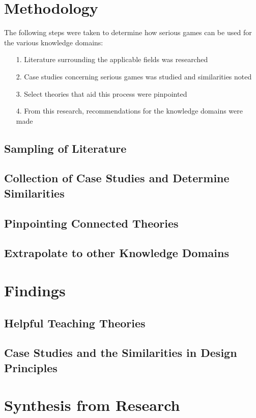 \documentclass[conference]{IEEEtran}
\begin{document}
\section{Methodology}
The following steps were taken to determine how serious games can be used for the various knowledge domains:

\begin{itemize}
\item[1.] Literature surrounding the applicable fields was researched
\item[2.] Case studies concerning serious games was studied and similarities noted
\item[3.] Select theories that aid this process were pinpointed
\item[4.] From this research, recommendations for the knowledge domains were made
\end{itemize}

\subsection{Sampling of Literature}
\subsection{Collection of Case Studies and Determine Similarities}
\subsection{Pinpointing Connected Theories}
\subsection{Extrapolate to other Knowledge Domains}

\section{Findings}
\subsection{Helpful Teaching Theories}
\subsection{Case Studies and the Similarities in Design Principles}

\section{Synthesis from Research}
\end{document}
